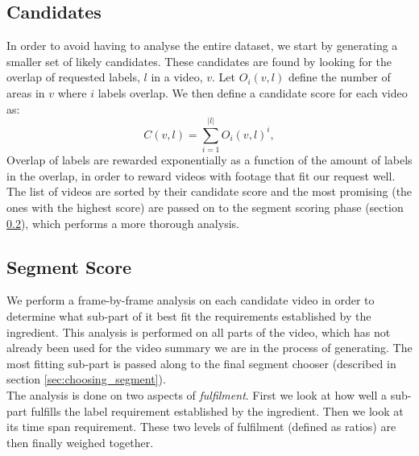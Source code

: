 \subsection{Candidates}\label{sec:candidates}
%
In order to avoid having to analyse the entire dataset, we start by generating a smaller set of likely candidates. These candidates are found by looking for the overlap of requested labels, $l$ in a video, $v$. Let $O_i(v,l)$ define the number of areas in $v$ where $i$ labels overlap. We then define a candidate score for each video as:
%
\[
C(v, l) = \sum_{i=1}^{|l|} O_i(v,l)^{i},
\]
%
Overlap of labels are rewarded exponentially as a function of the amount of labels in the overlap, in order to reward videos with footage that fit our request well.\\
The list of videos are sorted by their candidate score and the most promising (the ones with the highest score) are passed on to the segment scoring phase (section \ref{sec:segment_score}), which performs a more thorough analysis.
%
\subsection{Segment Score}\label{sec:segment_score}
%
We perform a frame-by-frame analysis on each candidate video in order to determine what sub-part of it best fit the requirements established by the ingredient. This analysis is performed on all parts of the video, which has not already been used for the video summary we are in the process of generating. The most fitting sub-part is passed along to the final segment chooser (described in section \ref{sec:choosing_segment}).\\
The analysis is done on two aspects of \textit{fulfilment}. First we look at how well a sub-part fulfills the label requirement established by the ingredient. Then we look at its time span requirement. These two levels of fulfilment (defined as ratios) are then finally weighed together.
%
